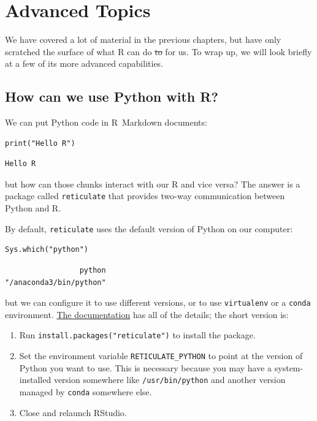 \chapter{Advanced Topics}\label{advanced}

We have covered a lot of material in the previous chapters,
but have only scratched the surface of what R can do \st{to} for us.
To wrap up,
we will look briefly at a few of its more advanced capabilities.

\section{How can we use Python with R?}

We can put Python code in R~Markdown documents:

\begin{lstlisting}
print("Hello R")
\end{lstlisting}

\begin{lstlisting}
Hello R
\end{lstlisting}

\noindent
but how can those chunks interact with our R and vice versa?
The answer is a package called \texttt{reticulate}
that provides two-way communication between Python and R.

By default,
\texttt{reticulate} uses the default version of Python on our computer:

\begin{lstlisting}
Sys.which("python")
\end{lstlisting}

\begin{lstlisting}
                 python 
"/anaconda3/bin/python" 
\end{lstlisting}

but we can configure it to use different versions,
or to use \texttt{virtualenv} or a \texttt{conda} environment.
\href{https://rstudio.github.io/reticulate/articles/versions.html}{The documentation}
has all of the details;
the short version is:

\begin{enumerate}
\item
  Run \texttt{install.packages("reticulate")} to install the package.
\item
  Set the environment variable \texttt{RETICULATE\_PYTHON}
  to point at the version of Python you want to use.
  This is necessary because you may have a system-installed version somewhere like \texttt{/usr/bin/python}
  and another version managed by \texttt{conda} somewhere else.
\item
  Close and relaunch RStudio.
\end{enumerate}

